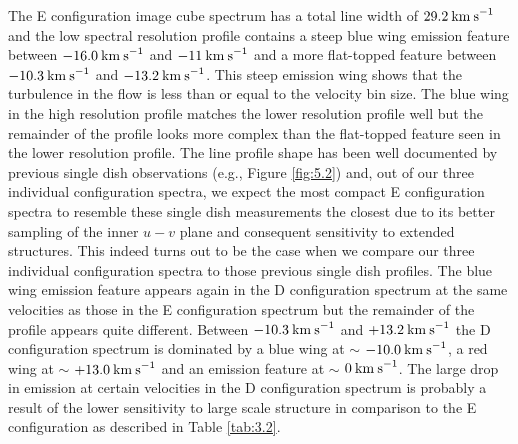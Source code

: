 The E configuration image cube spectrum has a total line width of $29.2\>{\rm km\>s}^{-1}$ and the low spectral resolution profile contains a steep blue wing emission feature between $-16.0\>{\rm km\>s}^{-1}$ and $-11\>{\rm km\>s}^{-1}$ and a more flat-topped feature between $-10.3\>{\rm km\>s}^{-1}$ and $-13.2\>{\rm km\>s}^{-1}$. This steep emission wing shows that the turbulence in the flow is less than or equal to the velocity bin size. The blue wing in the high resolution profile matches the lower resolution profile well but the remainder of the profile looks more complex than the flat-topped feature seen in the lower resolution profile. The line profile shape has been well documented by previous single dish observations (e.g., Figure \ref{fig:5.2}) and, out of our three individual configuration spectra, we expect the most compact E configuration spectra to resemble these single dish measurements the closest due to its better sampling of the inner $u-v$ plane and consequent sensitivity to extended structures. This indeed turns out to be the case when we compare our three individual configuration spectra to those previous single dish profiles. The blue wing emission feature appears again in the D configuration spectrum at the same velocities as those in the E configuration spectrum but the remainder of the profile appears quite different. Between $-10.3\>{\rm km\>s}^{-1}$ and $+13.2\>{\rm km\>s}^{-1}$ the D configuration spectrum is dominated by a blue wing at $\sim$ $-10.0\>{\rm km\>s}^{-1}$, a red wing at $\sim$ $+13.0\>{\rm km\>s}^{-1}$ and an emission feature at $\sim$ $0\>{\rm km\>s}^{-1}$. The large drop in emission at certain velocities in the D configuration spectrum is probably a result of the lower sensitivity to large scale structure in comparison to the E configuration as described in Table \ref{tab:3.2}.

